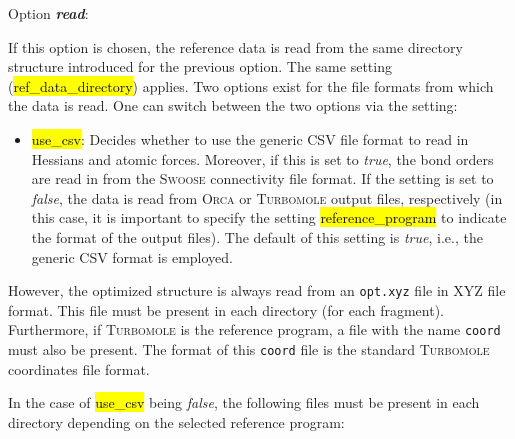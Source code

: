\documentclass[]{tufte-book}
\begin{document}
Option \textit{\textbf{read}}:

If this option is chosen, the reference data is read from the same directory structure introduced for the previous option. The same setting (\hl{ref\_data\_directory}) applies. Two options exist for the file formats from which the data is read. One can switch between the two options via the setting:
\begin{itemize}
\item \hl{use\_csv}: Decides whether to use the generic CSV file format to read in Hessians and atomic forces. Moreover, if this is set to \textit{true}, the bond orders are read in from the \textsc{Swoose} connectivity file format. If the setting is set to \textit{false}, the data is read from \textsc{Orca} or \textsc{Turbomole} output files, respectively (in this case, it is important to specify the setting \hl{reference\_program} to indicate the format of the output files). The default of this setting is \textit{true}, i.e., the generic CSV format is employed.
\end{itemize}
However, the optimized structure is always read from an 
\texttt{opt.xyz} file in XYZ file format. This file must be present in each
directory (for each fragment). Furthermore, if \textsc{Turbomole} is the reference program, a file with the name \texttt{coord} must also be present. The format of this \texttt{coord} file is the standard \textsc{Turbomole} coordinates file format.

In the case of \hl{use\_csv} being \textit{false}, the following files must be present in each directory depending on the selected reference program: 
\end{document}
